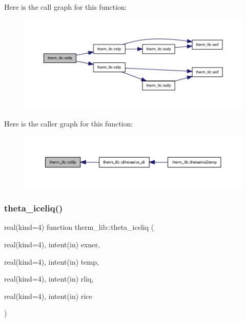 Here is the call graph for this function\+:
\nopagebreak
\begin{figure}[H]
\begin{center}
\leavevmode
\includegraphics[width=350pt]{namespacetherm__lib_a3ba8735d59b87e78d614f76ed778b639_cgraph}
\end{center}
\end{figure}
Here is the caller graph for this function\+:
\nopagebreak
\begin{figure}[H]
\begin{center}
\leavevmode
\includegraphics[width=350pt]{namespacetherm__lib_a3ba8735d59b87e78d614f76ed778b639_icgraph}
\end{center}
\end{figure}
\mbox{\label{namespacetherm__lib_a15a79fc7dd2aaabe7bc7da287e531324}} 
\subsubsection{\texorpdfstring{theta\+\_\+iceliq()}{theta\_iceliq()}}
{\footnotesize\ttfamily real(kind=4) function therm\+\_\+lib\+::theta\+\_\+iceliq (\begin{DoxyParamCaption}\item[{real(kind=4), intent(in)}]{exner,  }\item[{real(kind=4), intent(in)}]{temp,  }\item[{real(kind=4), intent(in)}]{rliq,  }\item[{real(kind=4), intent(in)}]{rice }\end{DoxyParamCaption})}

